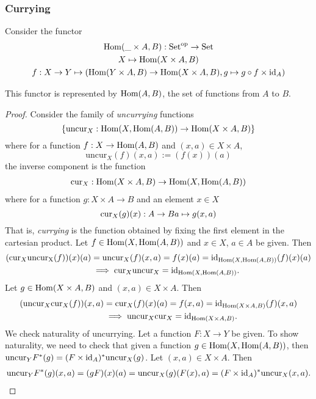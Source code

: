 \subsubsection{Currying}
Consider the functor 
\begin{gather*}
    \mathrm{Hom}(\_\times A,B) : \mathrm{Set}^\mathrm{op} \rightarrow \mathrm{Set}\\
    X \mapsto \mathrm{Hom}(X\times A, B)\\
    f: X\rightarrow Y \mapsto (\mathrm{Hom}(Y\times A, B) \rightarrow \mathrm{Hom}(X\times A,B), g\mapsto g \circ f \times \mathrm{id}_A)
\end{gather*}
\begin{proposition}
    This functor is represented by $\mathrm{Hom}(A,B)$, the set of functions from $A$ to $B$.
\end{proposition}
\begin{proof}
    Consider the family of \emph{uncurrying} functions 
    $$
        \{ \mathrm{uncur}_X : \mathrm{Hom}(X, \mathrm{Hom}(A,B)) \rightarrow \mathrm{Hom}(X\times A,B)\}
    $$
    where for a function $f : X\rightarrow \mathrm{Hom}(A,B)$ and $(x,a)\in X\times A$,  
    $$
        \mathrm{uncur}_X(f)(x,a) := (f(x))(a)
    $$
    the inverse component is the function 
    \begin{gather*}
        \mathrm{cur}_X : \mathrm{Hom}(X\times A, B) \rightarrow \mathrm{Hom}(X,\mathrm{Hom}(A,B))
    \end{gather*} 
    where for a function $g:X\times A \rightarrow B$ and an element $x\in X$ 
    $$
        \mathrm{cur}_X(g)(x) : A\rightarrow B\\
        a \mapsto g(x,a)
    $$
    That is, \emph{currying} is the function obtained by fixing the first element in the cartesian product.  
    Let $f\in \mathrm{Hom}(X,\mathrm{Hom}(A,B))$ and $x\in X$, $a\in A$ be given. Then 
    \begin{align*}
        (\mathrm{cur}_X\mathrm{uncur_X}(f))(x)(a) &= \mathrm{uncur}_X(f)(x,a)=f(x)(a) = \mathrm{id}_{\mathrm{Hom}(X,\mathrm{Hom}(A,B))}(f)(x)(a)\\ 
        &\implies \mathrm{cur}_X\mathrm{uncur}_X = \mathrm{id}_{\mathrm{Hom}(X,\mathrm{Hom}(A,B))}.
    \end{align*}
    Let $g\in \mathrm{Hom}(X\times A,B)$ and $(x,a)\in X\times A$. Then
    \begin{align*}
        (\mathrm{uncur}_X\mathrm{cur}_X(f))(x,a) &= \mathrm{cur}_X(f)(x)(a)=f(x,a) = \mathrm{id}_{\mathrm{Hom}(X\times A,B)}(f)(x,a)\\
        &\implies \mathrm{uncur}_X\mathrm{cur}_X = \mathrm{id}_{\mathrm{Hom}(X\times A,B)}.
    \end{align*}
    We check naturality of uncurrying. Let a function $F: X\rightarrow Y$ be given. To show naturality, we need to check that given a function $g\in \mathrm{Hom}(X,\mathrm{Hom}(A,B))$, then $ \mathrm{uncur}_YF^\ast(g) = (F\times \mathrm{id}_A)^\ast\mathrm{uncur}_X(g)$. Let $(x,a)\in X\times A$. Then 
    \begin{align*}
         \mathrm{uncur}_YF^\ast(g)(x,a) = (gF)(x)(a)= \mathrm{uncur}_X(g)(F(x),a)= (F\times \mathrm{id}_A)^\ast\mathrm{uncur}_X(x,a). 
    \end{align*} 
\end{proof}


